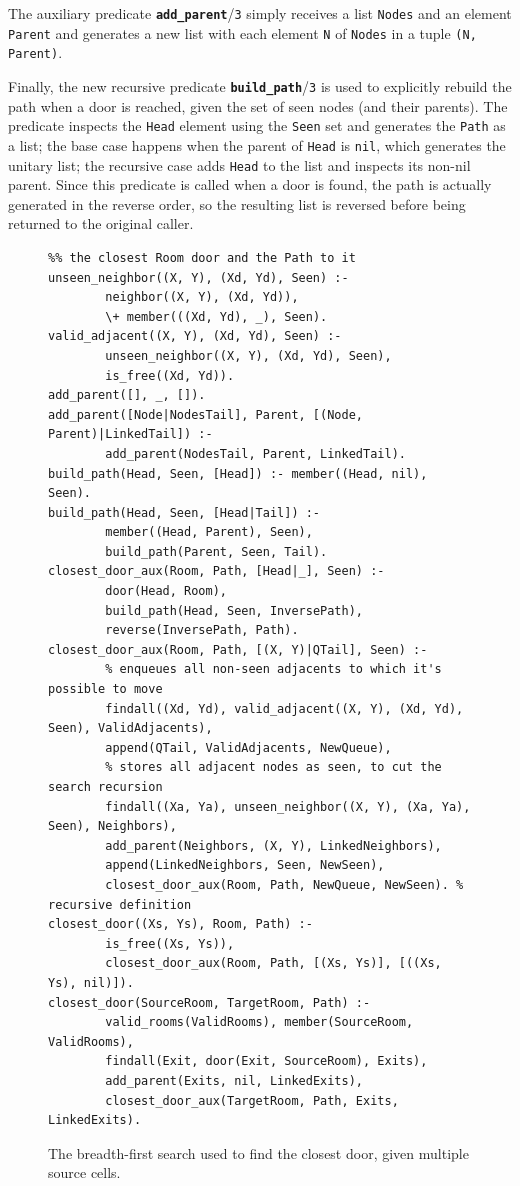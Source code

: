 \documentclass[12pt,a4paper]{article}
\newcommand{\varname}[1]{\texttt{#1}}
\newcommand{\varnamebf}[1]{\textbf{\texttt{#1}}}
\newcommand{\predprot}[2]{{\color{MidnightBlue}\varnamebf{#1}}/{\color{Mulberry}\varname{#2}}}
\begin{document}
The auxiliary predicate \predprot{add\_parent}{3} simply receives a list \varname{Nodes} and an element \varname{Parent} and generates a new list with each element \varname{N} of \varname{Nodes} in a tuple \varname{(N, Parent)}.

Finally, the new recursive predicate \predprot{build\_path}{3} is used to explicitly rebuild the path when a door is reached, given the set of seen nodes (and their parents). The predicate inspects the \varname{Head} element using the \varname{Seen} set and generates the \varname{Path} as a list; the base case happens when the parent of \varname{Head} is \varname{nil}, which generates the unitary list; the recursive case adds \varname{Head} to the list and inspects its non-nil parent. Since this predicate is called when a door is found, the path is actually generated in the reverse order, so the resulting list is reversed before being returned to the original caller.

\begin{figure}[H]
	\centering
\begin{lstlisting}[style=Prolog-pygsty]
%% closest_door((Xs, Ys), Room, Path) - starting at <Xs, Ys>, finds
%% the closest Room door and the Path to it
unseen_neighbor((X, Y), (Xd, Yd), Seen) :-
		neighbor((X, Y), (Xd, Yd)),
		\+ member(((Xd, Yd), _), Seen).
valid_adjacent((X, Y), (Xd, Yd), Seen) :-
		unseen_neighbor((X, Y), (Xd, Yd), Seen),
		is_free((Xd, Yd)).
add_parent([], _, []).
add_parent([Node|NodesTail], Parent, [(Node, Parent)|LinkedTail]) :-
		add_parent(NodesTail, Parent, LinkedTail).
build_path(Head, Seen, [Head]) :- member((Head, nil), Seen).
build_path(Head, Seen, [Head|Tail]) :-
		member((Head, Parent), Seen),
		build_path(Parent, Seen, Tail).
closest_door_aux(Room, Path, [Head|_], Seen) :-
		door(Head, Room),
		build_path(Head, Seen, InversePath),
		reverse(InversePath, Path).
closest_door_aux(Room, Path, [(X, Y)|QTail], Seen) :-
		% enqueues all non-seen adjacents to which it's possible to move
		findall((Xd, Yd), valid_adjacent((X, Y), (Xd, Yd), Seen), ValidAdjacents),
		append(QTail, ValidAdjacents, NewQueue),
		% stores all adjacent nodes as seen, to cut the search recursion
		findall((Xa, Ya), unseen_neighbor((X, Y), (Xa, Ya), Seen), Neighbors),
		add_parent(Neighbors, (X, Y), LinkedNeighbors),
		append(LinkedNeighbors, Seen, NewSeen),
		closest_door_aux(Room, Path, NewQueue, NewSeen). % recursive definition
closest_door((Xs, Ys), Room, Path) :-
		is_free((Xs, Ys)),
		closest_door_aux(Room, Path, [(Xs, Ys)], [((Xs, Ys), nil)]).
closest_door(SourceRoom, TargetRoom, Path) :-
		valid_rooms(ValidRooms), member(SourceRoom, ValidRooms),
		findall(Exit, door(Exit, SourceRoom), Exits),
		add_parent(Exits, nil, LinkedExits),
		closest_door_aux(TargetRoom, Path, Exits, LinkedExits).
\end{lstlisting}
	\caption{The breadth-first search used to find the closest door, given multiple source cells.} 
	\label{fig:bfs-ms}
\end{figure}
\end{document}
